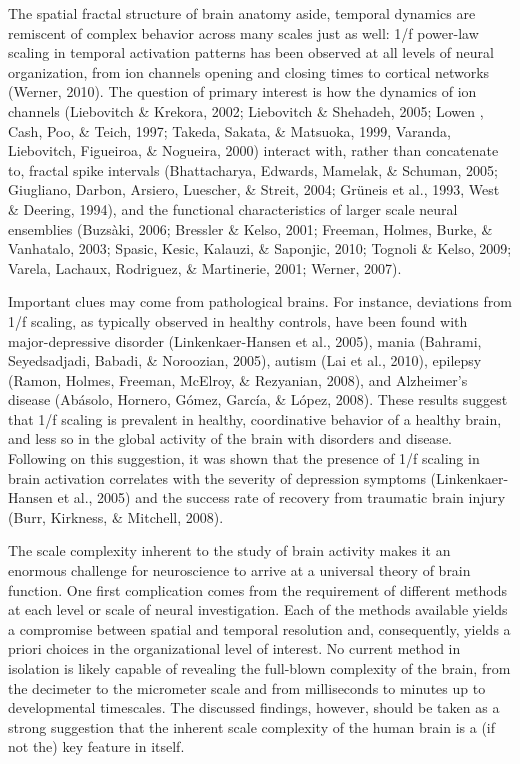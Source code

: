 \documentclass[12pt,]{book}
\begin{document}
The spatial fractal structure of brain anatomy aside, temporal dynamics are remiscent of complex behavior across many scales just as well: 1/f power-law scaling in temporal activation patterns has been observed at all levels of neural organization, from ion channels opening and closing times to cortical networks (Werner, 2010). The question of primary interest is how the dynamics of ion channels (Liebovitch \& Krekora, 2002; Liebovitch \& Shehadeh, 2005; Lowen , Cash, Poo, \& Teich, 1997; Takeda, Sakata, \& Matsuoka, 1999, Varanda, Liebovitch, Figueiroa, \& Nogueira, 2000) interact with, rather than concatenate to, fractal spike intervals (Bhattacharya, Edwards, Mamelak, \& Schuman, 2005; Giugliano, Darbon, Arsiero, Luescher, \& Streit, 2004; Grüneis et al., 1993, West \& Deering, 1994), and the functional characteristics of larger scale neural ensemblies (Buzsàki, 2006; Bressler \& Kelso, 2001; Freeman, Holmes, Burke, \& Vanhatalo, 2003; Spasic, Kesic, Kalauzi, \& Saponjic, 2010; Tognoli \& Kelso, 2009; Varela, Lachaux, Rodriguez, \& Martinerie, 2001; Werner, 2007).

Important clues may come from pathological brains. For instance, deviations from 1/f scaling, as typically observed in healthy controls, have been found with major-depressive disorder (Linkenkaer-Hansen et al., 2005), mania (Bahrami, Seyedsadjadi, Babadi, \& Noroozian, 2005), autism (Lai et al., 2010), epilepsy (Ramon, Holmes, Freeman, McElroy, \& Rezyanian, 2008), and Alzheimer's disease (Abásolo, Hornero, Gómez, García, \& López, 2008). These results suggest that 1/f scaling is prevalent in healthy, coordinative behavior of a healthy brain, and less so in the global activity of the brain with disorders and disease. Following on this suggestion, it was shown that the presence of 1/f scaling in brain activation correlates with the severity of depression symptoms (Linkenkaer-Hansen et al., 2005) and the success rate of recovery from traumatic brain injury (Burr, Kirkness, \& Mitchell, 2008).

The scale complexity inherent to the study of brain activity makes it an enormous challenge for neuroscience to arrive at a universal theory of brain function. One first complication comes from the requirement of different methods at each level or scale of neural investigation. Each of the methods available yields a compromise between spatial and temporal resolution and, consequently, yields a priori choices in the organizational level of interest. No current method in isolation is likely capable of revealing the full-blown complexity of the brain, from the decimeter to the micrometer scale and from milliseconds to minutes up to developmental timescales. The discussed findings, however, should be taken as a strong suggestion that the inherent scale complexity of the human brain is a (if not the) key feature in itself.
\end{document}
